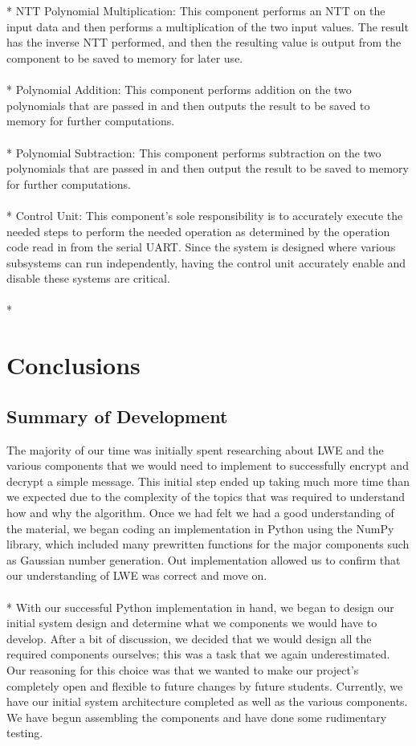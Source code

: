 \documentclass{article}
\begin{document}
\\
\\*
NTT Polynomial Multiplication:  This component performs an NTT on the input data and then performs a multiplication of the two input values. The result has the inverse NTT performed, and then the resulting value is output from the component to be saved to memory for later use. 
\\
\\*
Polynomial Addition: This component performs addition on the two polynomials that are passed in and then outputs the result to be saved to memory for further computations.
\\
\\*
Polynomial Subtraction: This component performs subtraction on the two polynomials that are passed in and then output the result to be saved to memory for further computations.
\\
\\*
Control Unit: This component's sole responsibility is to accurately execute the needed steps to perform the needed operation as determined by the operation code read in from the serial UART. Since the system is designed where various subsystems can run independently, having the control unit accurately enable and disable these systems are critical. 
\\
\\*

\section{Conclusions}
\subsection{Summary of Development}
The majority of our time was initially spent researching about LWE and the various components that we would need to implement to successfully encrypt and decrypt a simple message. This initial step ended up taking much more time than we expected due to the complexity of the topics that was required to understand how and why the algorithm. Once we had felt we had a good understanding of the material, we began coding an implementation in Python using the NumPy library, which included many prewritten functions for the major components such as Gaussian number generation. Out implementation allowed us to confirm that our understanding of LWE was correct and move on.
\\
\\*
With our successful Python implementation in hand, we began to design our initial system design and determine what we components we would have to develop. After a bit of discussion, we decided that we would design all the required components ourselves; this was a task that we again underestimated. Our reasoning for this choice was that we wanted to make our project’s completely open and flexible to future changes by future students. Currently, we have our initial system architecture completed as well as the various components. We have begun assembling the components and have done some rudimentary testing.
\end{document}
